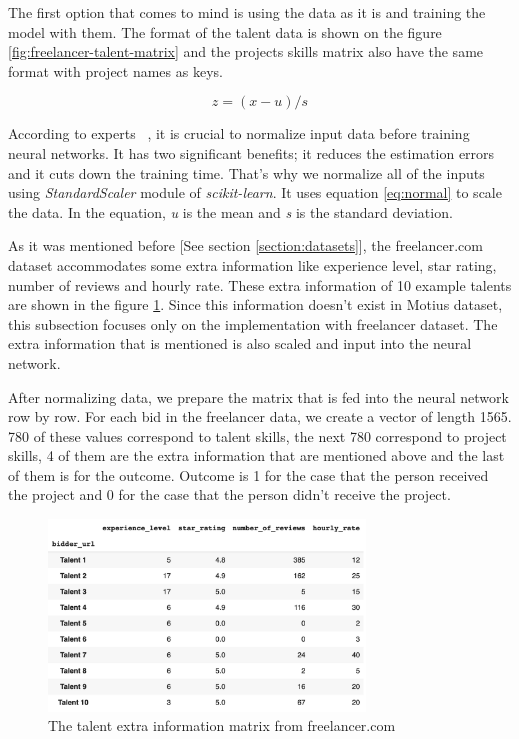 The first option that comes to mind is using the data as it is and training the model with them. The format of the talent data is shown on the figure \ref{fig:freelancer-talent-matrix} and the projects skills matrix also have the same format with project names as keys.

\begin{equation}
z = (x - u) / s
\label{eq:normal}
\end{equation}

According to experts ~\parencite{sola1997importance}, it is crucial to normalize input data before training neural networks. It has two significant benefits; it reduces the estimation errors and it cuts down the training time. That's why we normalize all of the inputs using \textit{StandardScaler} module of \textit{scikit-learn}. It uses equation \ref{eq:normal} to scale the data. In the equation, \textit{u} is the mean and \textit{s} is the standard deviation.

As it was mentioned before [See section \ref{section:datasets}], the freelancer.com dataset accommodates some extra information like experience level, star rating, number of reviews and hourly rate. These extra information of 10 example talents are shown in the figure \ref{fig:freelancer-talent-meta}. Since this information doesn't exist in Motius dataset, this subsection focuses only on the implementation with freelancer dataset. The extra information that is mentioned is also scaled and input into the neural network. 


After normalizing data, we prepare the matrix that is fed into the neural network row by row. For each bid in the freelancer data, we create a vector of length 1565. 780 of these values correspond to talent skills, the next 780 correspond to project skills, 4 of them are the extra information that are mentioned above and the last of them is for the outcome. Outcome is 1 for the case that the person received the project and 0 for the case that the person didn't receive the project.


\begin{figure}[h]
	\centering
	\includegraphics[width=0.75\textwidth]{figures/FreelancerTalentMeta.png}
	\caption{The talent extra information matrix from freelancer.com}
	\label{fig:freelancer-talent-meta}
\end{figure}

